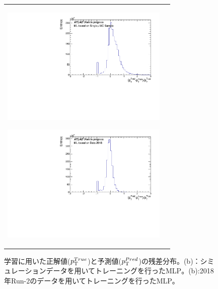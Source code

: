 \begin{figure}
    \begin{tabular}{cc}
    \centering
    \begin{minipage}[b]{0.45\hsize}%
        \centering
        \hspace*{-1.5cm}
        \includegraphics[clip, width=8cm]{fig/4/MC_predtrue.pdf}
        \subcaption{}
        \label{fig:predtrue_MC}
    \end{minipage}%
    \begin{minipage}[b]{0.7\hsize}%
        \centering
        \hspace*{-0.75cm}
        \includegraphics[clip, width=8cm]{fig/4/predtrue.pdf}
        \subcaption{}
        \label{fig:predtrue_Data}
    \end{minipage}%
    \end{tabular}
    \caption{学習に用いた正解値($p_{\rm{T}}^{True}$)と予測値($p_{\rm{T}}^{Pred}$)の残差分布。(b)：シミュレーションデータを用いてトレーニングを行ったMLP。(b):2018年Run-2のデータを用いてトレーニングを行ったMLP。}
    \label{fig:predtrue}
\end{figure}

